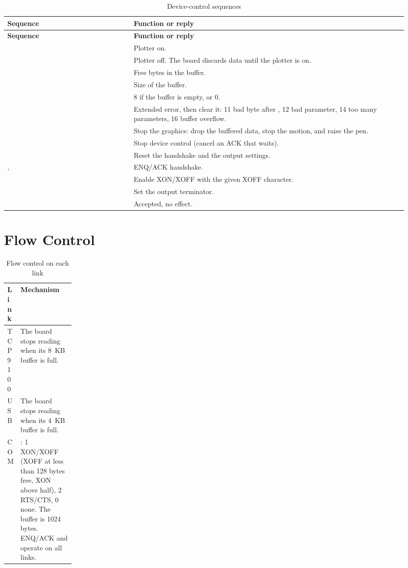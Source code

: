 \begin{longtable}{@{}P{0.3\linewidth}P{0.65\linewidth}@{}}
\caption{Device-control sequences}\label{tab:esc}\\
\toprule
\textbf{Sequence} & \textbf{Function or reply} \\
\midrule
\endfirsthead
\toprule
\textbf{Sequence} & \textbf{Function or reply} \\
\midrule
\endhead
\bottomrule
\endfoot
{}  & Plotter on. \\
  & Plotter off. The board discards data until the plotter is on. \\
 & Free bytes in the buffer. \\
 & Size of the buffer. \\
 & 8 if the buffer is empty, or 0. \\
 & Extended error, then clear it: 11 bad byte after , 12 bad
parameter, 14 too many parameters, 16 buffer overflow. \\
 & Stop the graphics: drop the buffered data, stop the motion, and raise the pen. \\
 & Stop device control (cancel an ACK that waits). \\
 & Reset the handshake and the output settings. \\
,  & ENQ/ACK handshake. \\
 & Enable XON/XOFF with the given XOFF character. \\
 & Set the output terminator. \\
     & Accepted, no effect. \\
\end{longtable}

\section{Flow Control}

\begin{table}[htbp]
\centering
\caption{Flow control on each link}\label{tab:flow}
\begin{tabularx}{\linewidth}{@{}P{0.16\linewidth}L@{}}
\toprule
\textbf{Link} & \textbf{Mechanism} \\
\midrule
TCP 9100 & The board stops reading when its 8~KB buffer is full. \\
USB & The board stops reading when its 4~KB buffer is full. \\
COM & : 1 XON/XOFF (XOFF at less than 128 bytes free, XON
above half), 2 RTS/CTS, 0 none. The buffer is 1024 bytes. ENQ/ACK and
 operate on all links. \\
\bottomrule
\end{tabularx}
\end{table}
